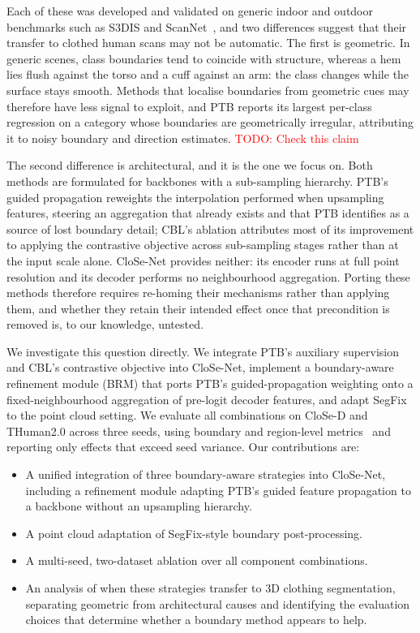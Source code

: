 \documentclass{article}
\theoremstyle{plain}
\theoremstyle{definition}
\theoremstyle{remark}
\begin{document}
Each of these was developed and validated on generic indoor and outdoor
benchmarks such as S3DIS and ScanNet~\cite{dai2017scannet}, and two
differences suggest that their transfer to clothed human scans may not be
automatic. The first is geometric. In generic scenes, class boundaries tend to
coincide with structure, whereas a hem lies flush against the torso and a cuff
against an arm: the class changes while the surface stays smooth. Methods that
localise boundaries from geometric cues may therefore have less signal to
exploit, and PTB reports its largest per-class regression on a category whose
boundaries are geometrically irregular, attributing it to noisy boundary and
direction estimates. \textcolor{red}{TODO: Check this claim}

The second difference is architectural, and it is the one we focus on. Both
methods are formulated for backbones with a sub-sampling hierarchy. PTB's
guided propagation reweights the interpolation performed when upsampling
features, steering an aggregation that already exists and that PTB identifies
as a source of lost boundary detail; CBL's ablation attributes most of its
improvement to applying the contrastive objective across sub-sampling stages
rather than at the input scale alone. CloSe-Net provides neither: its encoder
runs at full point resolution and its decoder performs no neighbourhood
aggregation. Porting these methods therefore requires re-homing their
mechanisms rather than applying them, and whether they retain their intended
effect once that precondition is removed is, to our knowledge, untested.

We investigate this question directly. We integrate PTB's auxiliary
supervision and CBL's contrastive objective into CloSe-Net, implement a
boundary-aware refinement module (BRM) that ports PTB's guided-propagation
weighting onto a fixed-neighbourhood aggregation of pre-logit decoder
features, and adapt SegFix to the point cloud setting. We evaluate all
combinations on CloSe-D and THuman2.0 across three seeds, using boundary and
region-level metrics~\cite{cbl,biou} and reporting only effects that exceed
seed variance. Our contributions are:

\begin{itemize}
  \item A unified integration of three boundary-aware strategies into
        CloSe-Net, including a refinement module adapting PTB's guided feature
        propagation to a backbone without an upsampling hierarchy.
  \item A point cloud adaptation of SegFix-style boundary post-processing.
  \item A multi-seed, two-dataset ablation over all component combinations.
  \item An analysis of when these strategies transfer to 3D clothing
        segmentation, separating geometric from architectural causes and
        identifying the evaluation choices that determine whether a boundary
        method appears to help.
\end{itemize}
\end{document}
